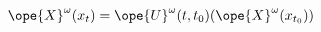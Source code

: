 \begin{equation}	\label{12.82}
\ope{X}^\omega(x_t) = \ope{U}^\omega(t,t_0) (\ope{X}^\omega(x_{t_0}))
	\end{equation}

